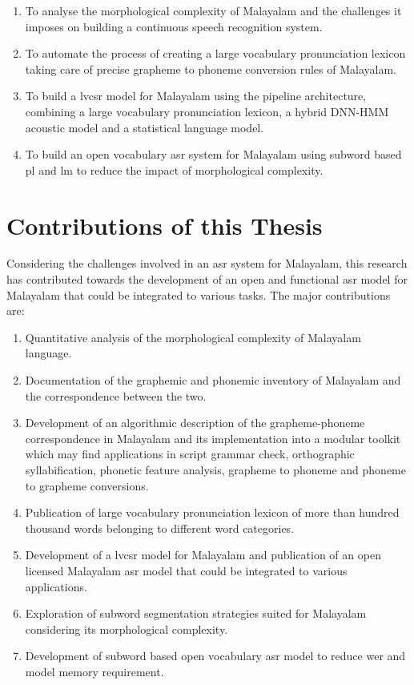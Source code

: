 \begin{enumerate}
      \item To analyse the morphological complexity of Malayalam and the challenges it
            imposes on building a continuous speech recognition system.
      \item To automate the process of creating a large vocabulary pronunciation lexicon
            taking care of precise grapheme to phoneme conversion rules of Malayalam.
      \item To build a \gls{lvcsr} model for Malayalam using the pipeline architecture,
            combining a large vocabulary pronunciation lexicon, a hybrid DNN-HMM acoustic
            model and a statistical language model.
      \item To build an open vocabulary \gls{asr} system for Malayalam using subword based
            \gls{pl} and \gls{lm} to reduce the impact of morphological complexity.

\end{enumerate}

\section{Contributions of this Thesis}

Considering the challenges involved in an \gls{asr} system
for Malayalam, this research has contributed towards the development of an open
and functional \gls{asr} model for Malayalam that could be integrated to
various tasks. The major contributions are:
\begin{enumerate}
      \item Quantitative analysis of the morphological complexity of Malayalam language.
      \item Documentation of the graphemic and phonemic inventory of Malayalam and the
            correspondence between the two.
      \item  Development of an algorithmic description of the grapheme-phoneme
            correspondence in Malayalam and its implementation into a modular toolkit which may find applications in script grammar check, orthographic syllabification, phonetic feature analysis, grapheme to phoneme and phoneme to grapheme conversions.
      \item  Publication of large vocabulary pronunciation lexicon of more than hundred thousand words belonging to different word categories.
      \item Development of a \gls{lvcsr} model for Malayalam and publication of an open licensed Malayalam \gls{asr} model that could be integrated to various
            applications.
      \item Exploration of subword segmentation strategies suited for Malayalam considering its morphological complexity.
      \item  Development of subword based open vocabulary \gls{asr} model to reduce
            \gls{wer} and model memory requirement.
\end{enumerate}



